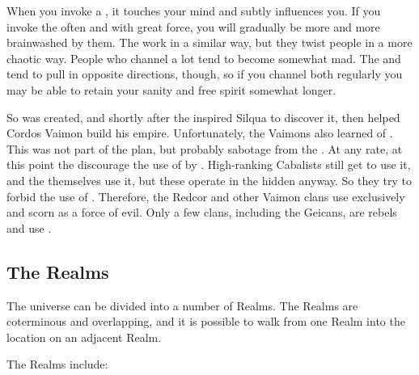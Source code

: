 When you invoke a \Sephirah, it touches your mind and subtly influences you. If you invoke the \Sephiroth{} often and with great force, you will gradually be more and more brainwashed by them. The \Kliffoth{} work in a similar way, but they twist people in a more chaotic way. People who channel \nieur{} a lot tend to become somewhat mad. The \Kliffoth{} and \Sephiroth{} tend to pull in opposite directions, though, so if you channel both regularly you may be able to retain your sanity and free spirit somewhat longer. 

So \iquin{} was created, and shortly after the \banes{} inspired Silqua to discover it, then helped Cordos Vaimon build his empire. Unfortunately, the Vaimons also learned of \nieur{}. This was not part of the \banesz{} plan, but probably sabotage from the \dragons{}. At any rate, at this point the \banes{} discourage the use of \nieur{} by \humans{}. High-ranking Cabalists still get to use it, and the \banes{} themselves use it, but these operate in the hidden anyway. So they try to forbid the use of \nieur{}. Therefore, the Redcor and other Vaimon clans use \iquin{} exclusively and scorn \nieur{} as a force of evil. Only a few clans, including the Geicans, are rebels and use \nieur{}. 








\subsection{The Realms}
The universe can be divided into a number of Realms. 
The Realms are coterminous and overlapping, and it is possible to walk from one Realm into the  location on an adjacent Realm. 

The Realms include: 

